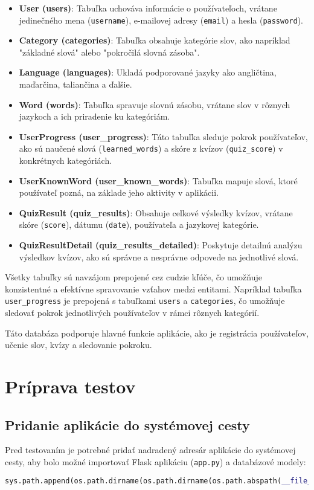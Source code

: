 \documentclass{article}
\begin{document}
\begin{itemize}
    \item \textbf{User (users)}: Tabuľka uchováva informácie o používateľoch, vrátane jedinečného mena (\texttt{username}), e-mailovej adresy (\texttt{email}) a hesla (\texttt{password}).
    \item \textbf{Category (categories)}: Tabuľka obsahuje kategórie slov, ako napríklad "základné slová" alebo "pokročilá slovná zásoba".
    \item \textbf{Language (languages)}: Ukladá podporované jazyky ako angličtina, maďarčina, taliančina a ďalšie.
    \item \textbf{Word (words)}: Tabuľka spravuje slovnú zásobu, vrátane slov v rôznych jazykoch a ich priradenie ku kategóriám.
    \item \textbf{UserProgress (user\_progress)}: Táto tabuľka sleduje pokrok používateľov, ako sú naučené slová (\texttt{learned\_words}) a skóre z kvízov (\texttt{quiz\_score}) v konkrétnych kategóriách.
    \item \textbf{UserKnownWord (user\_known\_words)}: Tabuľka mapuje slová, ktoré používateľ pozná, na základe jeho aktivity v aplikácii.
    \item \textbf{QuizResult (quiz\_results)}: Obsahuje celkové výsledky kvízov, vrátane skóre (\texttt{score}), dátumu (\texttt{date}), používateľa a jazykovej kategórie.
    \item \textbf{QuizResultDetail (quiz\_results\_detailed)}: Poskytuje detailnú analýzu výsledkov kvízov, ako sú správne a nesprávne odpovede na jednotlivé slová.
\end{itemize}

Všetky tabuľky sú navzájom prepojené cez cudzie kľúče, čo umožňuje konzistentné a efektívne spravovanie vzťahov medzi entitami. Napríklad tabuľka \texttt{user\_progress} je prepojená s tabuľkami \texttt{users} a \texttt{categories}, čo umožňuje sledovať pokrok jednotlivých používateľov v rámci rôznych kategórií.

Táto databáza podporuje hlavné funkcie aplikácie, ako je registrácia používateľov, učenie slov, kvízy a sledovanie pokroku.


\newpage
\section{Príprava testov}
\subsection{Pridanie aplikácie do systémovej cesty}
Pred testovaním je potrebné pridať nadradený adresár aplikácie do systémovej cesty, aby bolo možné importovať Flask aplikáciu (\texttt{app.py}) a databázové modely:
\begin{lstlisting}[language=Python]
sys.path.append(os.path.dirname(os.path.dirname(os.path.abspath(__file__))))
\end{lstlisting}
\end{document}
